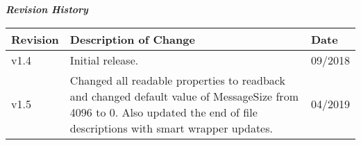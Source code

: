 \iffalse
This file is protected by Copyright. Please refer to the COPYRIGHT file
distributed with this source distribution.

This file is part of OpenCPI <http://www.opencpi.org>

OpenCPI is free software: you can redistribute it and/or modify it under the
terms of the GNU Lesser General Public License as published by the Free Software
Foundation, either version 3 of the License, or (at your option) any later
version.

OpenCPI is distributed in the hope that it will be useful, but WITHOUT ANY
WARRANTY; without even the implied warranty of MERCHANTABILITY or FITNESS FOR A
PARTICULAR PURPOSE. See the GNU Lesser General Public License for more details.

You should have received a copy of the GNU Lesser General Public License along
with this program. If not, see <http://www.gnu.org/licenses/>.
\fi

\def\comp{file\_{}read}
\def\Comp{File\ Read}
\def\docTitle{\Comp{} Component Data Sheet}
\def\snippetpath{../../../../../doc/av/tex/snippets/}

\graphicspath{{figures/}}


\maketitle
\thispagestyle{empty}
\newpage

\begin{center}
  \textit{\textbf{Revision History}}
\end{center}
\begin{longtable}{|p{}
                  |p{}
                  |p{}|}
  \hline
  \rowcolor{blue}
  \textbf{Revision} & \textbf{Description of Change} & \textbf{Date} \\
  \hline
  v1.4 & Initial release. & 09/2018 \\
  \hline
  v1.5 & Changed all readable properties to readback and changed default value of MessageSize from 4096 to 0. Also updated the end of file descriptions with smart wrapper updates.  & 04/2019 \\
  \hline
\end{longtable}
\newpage

